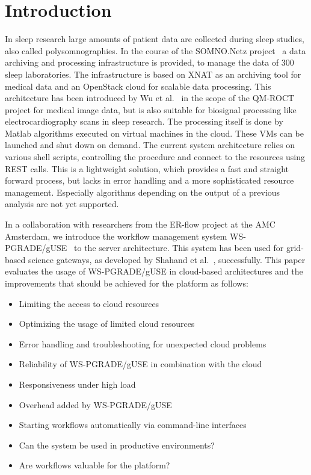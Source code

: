 \section{Introduction}\label{introduction}

In sleep research large amounts of patient data are collected during sleep studies, also called polysomnographies.
In the course of the SOMNO.Netz project~\cite{krefting13} a data archiving and processing infrastructure is provided, to manage the data of 300 sleep laboratories.
The infrastructure is based on XNAT as an archiving tool for medical data and an OpenStack cloud for scalable data processing.
This architecture has been introduced by Wu et al.~\cite{wu14} in the scope of the QM-ROCT project for medical image data, but is also suitable for biosignal processing like electrocardiography scans in sleep research.
The processing itself is done by Matlab algorithms executed on virtual machines in the cloud. These VMs can be launched and shut down on demand.
The current system architecture relies on various shell scripts, controlling the procedure and connect to the resources using REST \cite{richardson07} calls.
This is a lightweight solution, which provides a fast and straight forward process, but lacks in error handling and a more sophisticated resource management.
Especially algorithms depending on the output of a previous analysis are not yet supported.

In a collaboration with researchers from the ER-flow project at the AMC Amsterdam, we introduce the workflow management system WS-PGRADE/gUSE~\cite{balasko13} to the server architecture. This system has been used for grid-based science gateways, as developed by Shahand et al.~\cite{shahand13}, successfully.
This paper evaluates the usage of WS-PGRADE/gUSE in cloud-based architectures and the improvements that should be achieved for the platform as follows:

\begin{itemize}
\item Limiting the access to cloud resources
\item Optimizing the usage of limited cloud resources
\item Error handling and troubleshooting for unexpected cloud problems
\item Reliability of WS-PGRADE/gUSE in combination with the cloud
\item Responsiveness under high load
\item Overhead added by WS-PGRADE/gUSE
\item Starting workflows automatically via command-line interfaces
\item Can the system be used in productive environments?
\item Are workflows valuable for the platform?
\end{itemize}